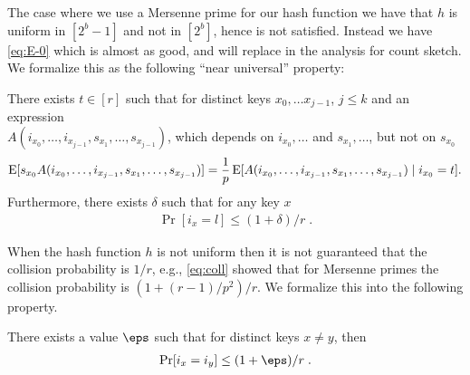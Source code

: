 The case where we use a Mersenne prime for our hash function we have that $h$ is uniform in $[2^b - 1]$ and not in $[2^b]$, hence  is not satisfied.
Instead we have \cref{eq:E-0} which is almost as good, and will replace  in the analysis for count sketch.
We formalize this as the following ``near universal'' property:
\begin{property}\label{prop:near-independence}
    There exists $t \in [r]$ such that for distinct keys $x_0, \ldots x_{j - 1}$, $j \le k$
    and an expression \\$A(i_{x_0}, \ldots, i_{x_{j - 1}}, s_{x_1}, \dots, s_{x_{j - 1}})$,
    which depends on $i_{x_0}, \ldots$
    and $s_{x_1}, \ldots$,
    but not on $s_{x_0}$
    \begin{align}
        \operatorname*{E}[s_{x_0} A(i_{x_0}, \ldots, i_{x_{j - 1}}, s_{x_1}, \ldots, s_{x_{j - 1}})]
            = \frac1p \operatorname*{E}[A(i_{x_0}, \ldots, i_{x_{j - 1}}, s_{x_1}, \ldots, s_{x_{j - 1}}) \mid i_{x_0} = t].
         \label{eq:near-independence}
    \end{align}
    Furthermore, there exists $\delta$ such that for any key $x$
    \begin{align}
        \Pr[i_x = l] \le (1 + \delta)/r \; .
         \label{eq:prob-special-value}
    \end{align}
\end{property}

When the hash function $h$ is not uniform then it is not guaranteed that
the collision probability is $1/r$, e.g., \eqref{eq:coll} showed that for
Mersenne primes the collision probability is $(1 + (r - 1)/p^2)/r$. We
formalize this into the following property.
\begin{property}\label{prop:collision}
    There exists a value $\eps$ such that for distinct keys $x \neq y$,
    then
    \begin{align}\label{eq:collision}
        \Pr[i_x = i_y] \le (1 + \eps)/r\; .
    \end{align}
\end{property}

